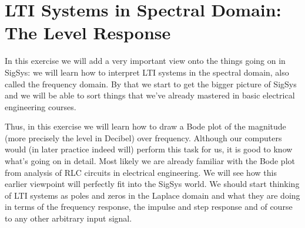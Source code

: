 
% 

\newpage
\section{LTI Systems in Spectral Domain: The Level Response}
\noindent In this exercise we will add a very important view onto the things
going on in SigSys: we will learn how to interpret LTI systems in the spectral
domain, also called the frequency domain. By that we start to get the bigger
picture of SigSys and we will be able to sort things that we've already mastered
in basic electrical engineering courses.

Thus, in this exercise we will learn how to draw a Bode plot of the
magnitude (more precisely the level in Decibel) over frequency.
Although our computers would (in later practice indeed will)
perform this task for us, it is good to know what's going on in detail.
Most likely we are already familiar with the Bode plot from analysis of RLC
circuits in electrical engineering. We will see how this earlier viewpoint will
perfectly fit into the SigSys world. We should start thinking of LTI systems as
poles and zeros in the Laplace domain and what they are doing in terms
of the frequency response, the impulse and step response and of course to
any other arbitrary input signal.

